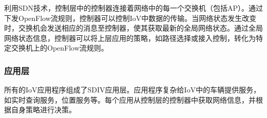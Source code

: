 利用SDN技术，控制层中的控制器连接着网络中的每一个交换机（包括AP）。通过下发OpenFlow流规则，控制器可以控制IoV中数据的传输。当网络状态发生改变时，交换机会发送相应的消息至控制器，使其获取最新的全局网络状态。通过全局网络状态信息，控制器可以将上层应用的策略，如路径选择或接入控制，转化为特定交换机上的OpenFlow流规则。


\subsubsection{应用层}

所有的IoV应用程序组成了SDIV应用层。应用程序复杂给IoV中的车辆提供服务，如实时查询服务，位置服务等。每个应用从控制层的控制器中获取网络信息，并根据自身策略进行决策。
%
%

